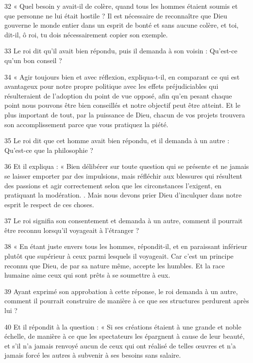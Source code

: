 \par 32 « Quel besoin y avait-il de colère, quand tous les hommes étaient soumis et que personne ne lui était hostile ? Il est nécessaire de reconnaître que Dieu gouverne le monde entier dans un esprit de bonté et sans aucune colère, et toi, dit-il, ô roi, tu dois nécessairement copier son exemple.

\par 33 Le roi dit qu'il avait bien répondu, puis il demanda à son voisin : Qu'est-ce qu'un bon conseil ?

\par 34 « Agir toujours bien et avec réflexion, expliqua-t-il, en comparant ce qui est avantageux pour notre propre politique avec les effets préjudiciables qui résulteraient de l'adoption du point de vue opposé, afin qu'en pesant chaque point nous pouvons être bien conseillés et notre objectif peut être atteint. Et le plus important de tout, par la puissance de Dieu, chacun de vos projets trouvera son accomplissement parce que vous pratiquez la piété.

\par 35 Le roi dit que cet homme avait bien répondu, et il demanda à un autre : Qu'est-ce que la philosophie ?

\par 36 Et il expliqua : « Bien délibérer sur toute question qui se présente et ne jamais se laisser emporter par des impulsions, mais réfléchir aux blessures qui résultent des passions et agir correctement selon que les circonstances l'exigent, en pratiquant la modération. . Mais nous devons prier Dieu d'inculquer dans notre esprit le respect de ces choses.

\par 37 Le roi signifia son consentement et demanda à un autre, comment il pourrait être reconnu lorsqu'il voyageait à l'étranger ?

\par 38 « En étant juste envers tous les hommes, répondit-il, et en paraissant inférieur plutôt que supérieur à ceux parmi lesquels il voyageait. Car c’est un principe reconnu que Dieu, de par sa nature même, accepte les humbles. Et la race humaine aime ceux qui sont prêts à se soumettre à eux.

\par 39 Ayant exprimé son approbation à cette réponse, le roi demanda à un autre, comment il pourrait construire de manière à ce que ses structures perdurent après lui ?

\par 40 Et il répondit à la question : « Si ses créations étaient à une grande et noble échelle, de manière à ce que les spectateurs les épargnent à cause de leur beauté, et s'il n'a jamais renvoyé aucun de ceux qui ont réalisé de telles œuvres et n'a jamais forcé les autres à subvenir à ses besoins sans salaire.

